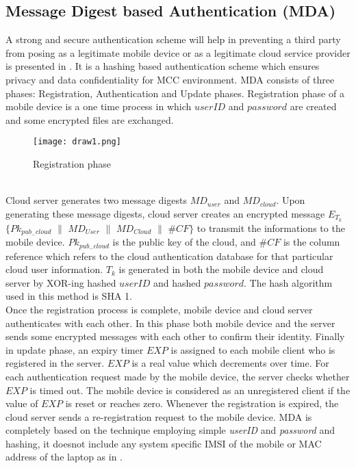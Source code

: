 \documentclass[10pt,a4paper,journal]{IEEEtran}
\begin{document}
\subsection{Message Digest based Authentication (MDA)} 
A strong and secure authentication scheme will help in preventing a third party from posing as a legitimate mobile device or as a legitimate cloud service provider is presented in \cite{4}. It is a hashing based authentication scheme which ensures privacy and data confidentiality for MCC environment. MDA consists of three phases: Registration, Authentication and Update phases. Registration phase of a mobile device is a one time process in which $userID$ and $password$ are created and some encrypted files are exchanged. 
\begin{figure}[htbp]
\centering
\texttt{[image: draw1.png]} 
\caption{Registration phase \cite{4}}
\label{1}
\end{figure}\\
\hspace{2em} Cloud server generates two message digests $MD_{user}$ and $MD_{cloud}$. Upon generating these message digests, cloud server creates an encrypted message $E_{T_{k}}$ $\lbrace Pk_{pub_{-}cloud}$ $\parallel$ $MD_{User}$ $\parallel$ $MD_{Cloud}$ $\parallel$ $\#CF\rbrace$ to transmit the informations to the mobile device. $Pk_{pub_{-}cloud}$ is the public key of the cloud, and $\#CF$ is the column reference which refers to the cloud authentication database for that particular cloud user information. $T_{k}$ is generated in both the mobile device and cloud server by XOR-ing hashed $userID$ and hashed $password$. The hash algorithm used in this method is SHA 1.\\
\hspace*{2em} Once the registration process is complete, mobile device and cloud server authenticates with each other. In this phase both mobile device and the server sends some encrypted messages with each other to confirm their identity. Finally in update phase, an expiry timer $EXP$ is assigned to each mobile client who is registered in the server. $EXP$ is a real value which decrements over time. For each authentication request made by the mobile device, the server checks whether $EXP$ is timed out. The mobile device is considered as an unregistered client if the value of $EXP$ is reset or reaches zero. Whenever the registration is expired, the cloud server sends a re-registration request to the mobile device. MDA is completely based on the technique employing simple \textit{userID} and \textit{password} and hashing, it doesnot include any system specific IMSI of the mobile or MAC address of the laptop as in \cite{13}.  
\end{document}

